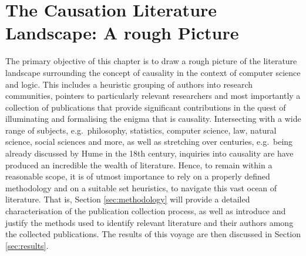 \documentclass[11pt,a4paper]{book}
\theoremstyle{definition}
\theoremstyle{definition}
\theoremstyle{definition}
\theoremstyle{remark}
\begin{document}
\chapter{The Causation Literature Landscape: A rough Picture}

The primary objective of this chapter is to draw a rough picture of the literature landscape surrounding the concept of causality in the context of computer science and logic.
This includes a heuristic grouping of authors into research communities, pointers to particularly relevant researchers and most importantly a collection of publications that provide significant contributions in the quest of illuminating and formalising the enigma that is causality. Intersecting with a wide range of subjects, e.g.\ philosophy, statistics, computer science, law, natural science, social sciences and more, as well as stretching over centuries, e.g.\ being already discussed by Hume in the 18th century, inquiries into causality are have produced an incredible the wealth of literature. Hence, to remain within a reasonable scope, it is of utmost importance to rely on a properly defined methodology and on a suitable set heuristics, to navigate this vast ocean of literature.
That is, Section \ref{sec:methodology} will provide a detailed characterisation of the publication collection process, as well as introduce and justify the methods used to identify relevant literature and their authors among the collected publications. The results of this voyage are then discussed in Section \ref{sec:results}.

%
%
% 
\end{document}
